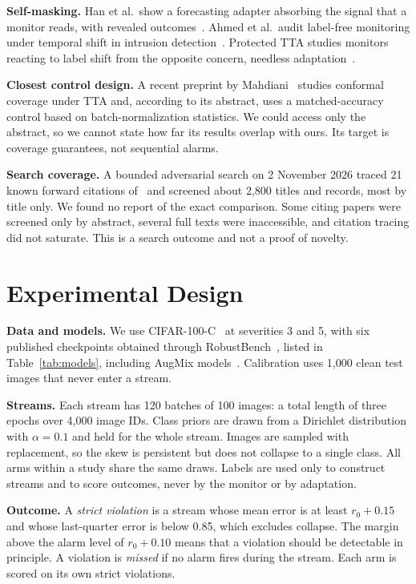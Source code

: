 \documentclass[runningheads]{llncs}
\begin{document}
\textbf{Self-masking.} Han et al.\ show a forecasting adapter absorbing the signal that a monitor reads, with revealed outcomes~\cite{Han2026Exchangeability}. Ahmed et al.\ audit label-free monitoring under temporal shift in intrusion detection~\cite{Ahmed2026Dashboard}. Protected TTA studies monitors reacting to label shift from the opposite concern, needless adaptation~\cite{Bar2024ProtectedTTA}.

\textbf{Closest control design.} A recent preprint by Mahdiani~\cite{Mahdiani2026ConformalTTA} studies conformal coverage under TTA and, according to its abstract, uses a matched-accuracy control based on batch-normalization statistics. We could access only the abstract, so we cannot state how far its results overlap with ours. Its target is coverage guarantees, not sequential alarms.

\textbf{Search coverage.} A bounded adversarial search on 2 November 2026 traced 21 known forward citations of~\cite{Schirmer2025Monitoring} and screened about 2,800 titles and records, most by title only. We found no report of the exact comparison. Some citing papers were screened only by abstract, several full texts were inaccessible, and citation tracing did not saturate. This is a search outcome and not a proof of novelty.

\section{Experimental Design}
\textbf{Data and models.} We use CIFAR-100-C~\cite{Hendrycks2019Corruptions} at severities 3 and 5, with six published checkpoints obtained through RobustBench~\cite{Croce2021RobustBench}, listed in Table~\ref{tab:models}, including AugMix models~\cite{Hendrycks2020AugMix}. Calibration uses 1,000 clean test images that never enter a stream.

\textbf{Streams.} Each stream has 120 batches of 100 images: a total length of three epochs over 4,000 image IDs. Class priors are drawn from a Dirichlet distribution with $\alpha=0.1$ and held for the whole stream. Images are sampled with replacement, so the skew is persistent but does not collapse to a single class. All arms within a study share the same draws. Labels are used only to construct streams and to score outcomes, never by the monitor or by adaptation.

\textbf{Outcome.} A \emph{strict violation} is a stream whose mean error is at least $r_0+0.15$ and whose last-quarter error is below 0.85, which excludes collapse. The margin above the alarm level of $r_0+0.10$ means that a violation should be detectable in principle. A violation is \emph{missed} if no alarm fires during the stream. Each arm is scored on its own strict violations.
\end{document}
